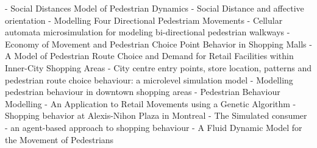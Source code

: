 \documentclass[a4paper, 12pt]{article}
\begin{document}
\newpage
    \begin{thebibliography}{9}
        \label{sec:refs}

         - Social Distances Model of Pedestrian Dynamics
         - Social Distance and affective orientation
         - Modelling Four Directional Pedestriam Movements
         - Cellular automata microsimulation for modeling bi-directional pedestrian walkways
         - Economy of Movement and Pedestrian Choice Point Behavior in Shopping Malls
         - A Model of Pedestrian Route Choice and Demand for Retail Facilities within Inner-City Shopping Areas
         - City centre entry points, store location, patterns and pedestrian route choice behaviour: a microlevel simulation model
         - Modelling pedestrian behaviour in downtown shopping areas
         - Pedestrian Behaviour Modelling - An Application to Retail Movements using a Genetic Algorithm
         - Shopping behavior at Alexis-Nihon Plaza in Montreal
         - The Simulated consumer - an agent-based approach to shopping behaviour
         - A Fluid Dynamic Model for the Movement of Pedestrians
    \end{thebibliography}
\end{document}
